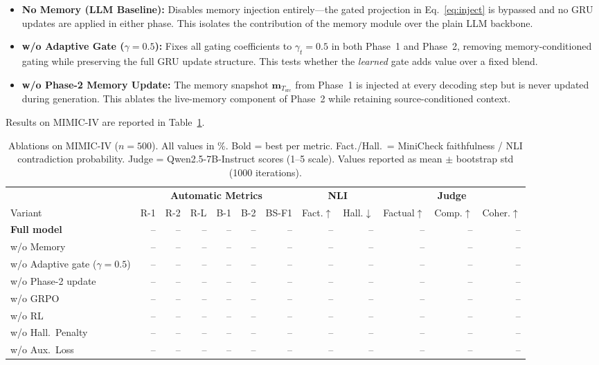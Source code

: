 \documentclass{article}
\begin{document}
\begin{itemize}
    \item \textbf{No Memory (LLM Baseline):} Disables memory injection entirely---the gated projection in Eq.~\ref{eq:inject} is bypassed and no GRU updates are applied in either phase. This isolates the contribution of the memory module over the plain LLM backbone.

    \item \textbf{w/o Adaptive Gate ($\gamma{=}0.5$):} Fixes all gating coefficients to $\gamma_t = 0.5$ in both Phase~1 and Phase~2, removing memory-conditioned gating while preserving the full GRU update structure. This tests whether the \emph{learned} gate adds value over a fixed blend.

    \item \textbf{w/o Phase-2 Memory Update:} The memory snapshot $\mathbf{m}_{T_{\text{src}}}$ from Phase~1 is injected at every decoding step but is never updated during generation. This ablates the live-memory component of Phase~2 while retaining source-conditioned context.
\end{itemize}

Results on MIMIC-IV are reported in Table~\ref{tab:ablation_arch}.

\begin{table}[t]
\centering
\caption{Ablations on MIMIC-IV ($n{=}500$). All values in \%. Bold = best per metric.
Fact./Hall.\ = MiniCheck faithfulness / NLI contradiction probability.
Judge = Qwen2.5-7B-Instruct scores (1--5 scale).
Values reported as mean $\pm$ bootstrap std (1000 iterations).}
\label{tab:ablation_arch}
\begin{tabular}{lrrrrrrrrrrr}
\toprule
& \multicolumn{6}{c}{\textbf{Automatic Metrics}} & \multicolumn{2}{c}{\textbf{NLI}} & \multicolumn{3}{c}{\textbf{Judge}} \\
\cmidrule(lr){2-7} \cmidrule(lr){8-9} \cmidrule(lr){10-12}
Variant & R-1 & R-2 & R-L & B-1 & B-2 & BS-F1 & Fact.$\uparrow$ & Hall.$\downarrow$ & Factual$\uparrow$ & Comp.$\uparrow$ & Coher.$\uparrow$ \\
\midrule
\textbf{Full model}                & -- & -- & -- & -- & -- & -- & -- & -- & -- & -- & -- \\
w/o Memory                         & -- & -- & -- & -- & -- & -- & -- & -- & -- & -- & -- \\
w/o Adaptive gate ($\gamma{=}0.5$) & -- & -- & -- & -- & -- & -- & -- & -- & -- & -- & -- \\
w/o Phase-2 update                 & -- & -- & -- & -- & -- & -- & -- & -- & -- & -- & -- \\
w/o GRPO                           & -- & -- & -- & -- & -- & -- & -- & -- & -- & -- & -- \\
w/o RL                             & -- & -- & -- & -- & -- & -- & -- & -- & -- & -- & -- \\
w/o Hall.\ Penalty                 & -- & -- & -- & -- & -- & -- & -- & -- & -- & -- & -- \\
w/o Aux.\ Loss                     & -- & -- & -- & -- & -- & -- & -- & -- & -- & -- & -- \\
\bottomrule
\end{tabular}
\end{table}
\end{document}
